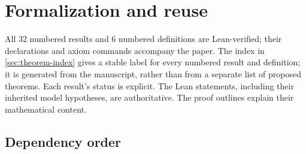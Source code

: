 \section{Formalization and reuse}
\label{sec:formalization}

All 32 numbered results and 6 numbered definitions
are Lean-verified;
their declarations and axiom commands accompany the paper. The index in
\cref{sec:theorem-index} gives a stable label for every numbered result
and definition; it is generated from the manuscript, rather than from
a separate list of proposed theorems. Each result's status is explicit.
The Lean statements, including their inherited model hypotheses, are
authoritative. The proof outlines explain their mathematical content.

\subsection{Dependency order}


